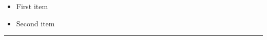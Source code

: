 \begin{itemize}
\color{blue}
\item First item
\item Second item
\end{itemize}
 
\noindent
{\color{red} \rule{\linewidth}{0.5mm} }